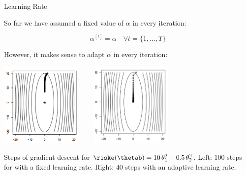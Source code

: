
\begin{vbframe}{Learning Rate}


So far we have assumed a fixed value of $\alpha$ in every iteration:

\vspace*{-0.2cm}
$$\alpha^{[t]} = \alpha \quad \forall t = {\{1, \ldots, T\}}$$

%
%

However, it makes sense to adapt $\alpha$ in every iteration:


\vspace*{-0.1cm}
\begin{center}
\includegraphics[width = 0.3\textwidth]{figure/stepsize_small.png} ~~~ \includegraphics[width = 0.3\textwidth]{figure/stepsize_adaptive.png} \\
\end{center}
\begin{footnotesize}
Steps of gradient descent for $\riske(\thetab) = 10\,\theta_1^2 + 0.5\,\theta_2^2$. Left:  100 steps for with a fixed learning rate. Right:  40 steps with an adaptive learning rate.
\end{footnotesize}


\end{vbframe}

